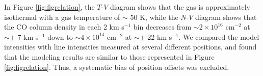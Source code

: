 In Figure \ref{fig:figrelation}, the $T$-$V$ diagram shows that the gas is approximately isothermal with a gas temperature of $\sim$ 50 K, while the $N$-$V$ diagram shows that the CO column density in each 2 km s$^{-1}$ bin decreases from $\sim 2 \times 10^{16} $ cm$^{-2}$ at $\sim \pm$ 7 km s$^{-1}$ down to $\sim 4 \times 10^{14}$ cm$^{-2}$ at $\sim \pm$ 22 km s$^{-1}$. We compared the model intensities with line intensities measured at several different positions, and found that the modeling results are similar to those represented in Figure \ref{fig:figrelation}. Thus, a systematic bias of position offsets was excluded.




